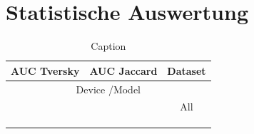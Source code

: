 
\section{Statistische Auswertung}



\begin{table}
    \centering
    \begin{tabular}{|c|c|c|}\hline
 AUC Tversky& AUC Jaccard&Dataset\\\hline
         \multicolumn{3}{|c|}{Device /Model}\\\hline
         &  & All\\\hline
         &  & \\\hline
         &  & \\\hline
         &  & \\ \hline
    \end{tabular}
    \caption{Caption}
    \label{tab:placeholder}
\end{table}

